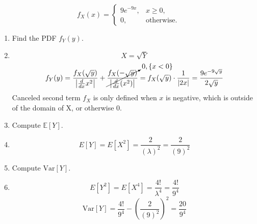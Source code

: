 \documentclass[12pt]{article}
\newenvironment{bluetext}{\color{blue}}{}
\begin{document}
\[
f_{X}(x)=\begin{cases}9e^{-9x},&x\geq 0,\\ 0,&\text{otherwise}.\end{cases}
\]
\begin{enumerate}
    \item[(a)] Find the PDF $f_{Y}(y)$.
    \item[] \begin{bluetext}
        \[X=\sqrt{Y}\]
        \[
f_Y(y)
= \frac{f_X(\sqrt{y})}{\left|\frac{d}{dx}x^2\right|}
+ \cancelto{0, \{x< 0\}}{\frac{f_X(-\sqrt{y})}{\left|\frac{d}{dx}(x^2)\right|}}
= f_X(\sqrt{y}) \cdot \frac{1}{\left|2x\right|}
= \frac{9e^{-9\sqrt{y}}}{2\sqrt{y}}
\]
Canceled second term $f_X$ is only defined when $x$ is negative, which is outside of the domain of X, or otherwise 0.
 \end{bluetext}
    \item[(b)] Compute $\mathbb{E}[Y]$.
    \item[] \begin{bluetext}
        \[E[Y]=E[X^2]=\frac{2}{(\lambda)^2}=\frac{2}{(9)^2}\]
    \end{bluetext}
    \item[(c)] Compute $\text{Var}[Y]$.
    \item[] \begin{bluetext}
        \[E[Y^2]=E[X^4]=\frac{4!}{\lambda^4}=\frac{4!}{9^4}\]
        \[\text{Var}[Y]=\frac{4!}{9^4}-\left(\frac{2}{(9)^2}\right)^2=\frac{20}{9^4}\]
    \end{bluetext}
\end{enumerate}
\end{document}
